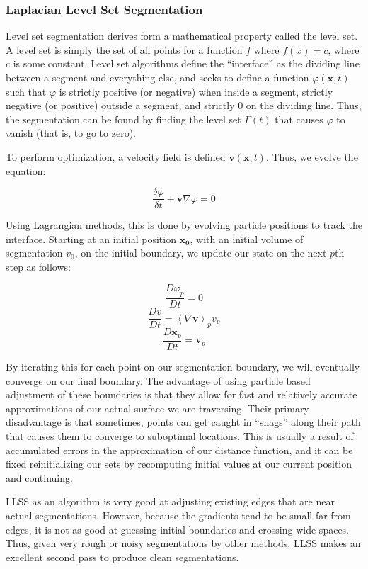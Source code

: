 \documentclass{article}
\begin{document}
\subsubsection*{Laplacian Level Set Segmentation}

Level set segmentation derives form a mathematical property called the level set. A level set is simply the set of all points for a function $f$ where $f(x) = c$, where $c$ is some constant. Level set algorithms define the ``interface'' as the dividing line between a segment and everything else, and seeks to define a function $\varphi(\mathbf{x},t)$ such that $\varphi$ is strictly positive (or negative) when inside a segment, strictly negative (or positive) outside a segment, and strictly $0$ on the dividing line. Thus, the segmentation can be found by finding the level set $\Gamma(t)$ that causes $\varphi$ to {\emph vanish} (that is, to go to zero).

To perform optimization, a velocity field is defined $\mathbf{v}(\mathbf{x},t)$. Thus, we evolve the equation\cite{osher}:

\[\frac{\delta\varphi}{\delta t} + \mathbf{v} \nabla\varphi = 0 \]

Using Lagrangian methods, this is done by evolving particle positions to track the interface. Starting at an initial position $\mathbf{x_0}$, with an initial volume of segmentation $v_0$, on the initial boundary, we update our state on the next $p$th step as follows\cite{hieber}:

\[\frac{D\varphi_p}{Dt} = 0 \]
\[\frac{Dv}{Dt} = \left< \nabla\mathbf{v}\right>_p v_p \]
\[\frac{D\mathbf{x}_p}{Dt} = \mathbf{v}_p \]

By iterating this for each point on our segmentation boundary, we will eventually converge on our final boundary. The advantage of using particle based adjustment of these boundaries is that they allow for fast and relatively accurate approximations of our actual surface we are traversing. Their primary disadvantage is that sometimes, points can get caught in ``snags'' along their path that causes them to converge to suboptimal locations. This is usually a result of accumulated errors in the approximation of our distance function, and it can be fixed reinitializing our sets by recomputing initial values at our current position and continuing\cite{hieber}.

LLSS as an algorithm is very good at adjusting existing edges that are near actual segmentations. However, because the gradients tend to be small far from edges, it is not as good at guessing initial boundaries and crossing wide spaces\cite{osher}. Thus, given very rough or noisy segmentations by other methods, LLSS makes an excellent second pass to produce clean segmentations.
\end{document}
